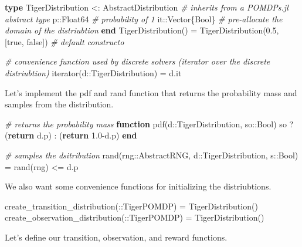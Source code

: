 \documentclass[12pt,]{article}
\newenvironment{Shaded}{}{}
\newcommand{\KeywordTok}[1]{\textcolor[rgb]{0.00,0.44,0.13}{\textbf{{#1}}}}
\newcommand{\DataTypeTok}[1]{\textcolor[rgb]{0.56,0.13,0.00}{{#1}}}
\newcommand{\FloatTok}[1]{\textcolor[rgb]{0.25,0.63,0.44}{{#1}}}
\newcommand{\CommentTok}[1]{\textcolor[rgb]{0.38,0.63,0.69}{\textit{{#1}}}}
\newcommand{\NormalTok}[1]{{#1}}
\begin{document}
\begin{Shaded}
\begin{Highlighting}[]
\KeywordTok{type} \NormalTok{TigerDistribution <: AbstractDistribution }\CommentTok{# inherits from a POMDPs.jl abstract type}
    \NormalTok{p::}\DataTypeTok{Float64} \CommentTok{# probability of 1}
    \NormalTok{it::}\DataTypeTok{Vector}\NormalTok{\{}\DataTypeTok{Bool}\NormalTok{\} }\CommentTok{# pre-allocate the domain of the distriubtion}
\KeywordTok{end}
\NormalTok{TigerDistribution() = TigerDistribution(}\FloatTok{0.5}\NormalTok{, [true, false]) }\CommentTok{# default constructo}

\CommentTok{# convenience function used by discrete solvers (iterator over the discrete distriubtion)}
\NormalTok{iterator(d::TigerDistribution) = d.it }
\end{Highlighting}
\end{Shaded}

Let's implement the pdf and rand function that returns the probability
mass and samples from the distribution.

\begin{Shaded}
\begin{Highlighting}[]
\CommentTok{# returns the probability mass }
\KeywordTok{function} \NormalTok{pdf(d::TigerDistribution, so::}\DataTypeTok{Bool}\NormalTok{)}
    \NormalTok{so ? (}\KeywordTok{return} \NormalTok{d.p) : (}\KeywordTok{return} \FloatTok{1.0}\NormalTok{-d.p)}
\KeywordTok{end}

\CommentTok{# samples the dsitribution}
\NormalTok{rand(rng::AbstractRNG, d::TigerDistribution, s::}\DataTypeTok{Bool}\NormalTok{) = rand(rng) <= d.p}
\end{Highlighting}
\end{Shaded}

We also want some convenience functions for initializing the
distriubtions.

\begin{Shaded}
\begin{Highlighting}[]
\NormalTok{create_transition_distribution(::TigerPOMDP) = TigerDistribution()}
\NormalTok{create_observation_distribution(::TigerPOMDP) = TigerDistribution()}
\end{Highlighting}
\end{Shaded}

Let's define our transition, observation, and reward functions.
\end{document}
